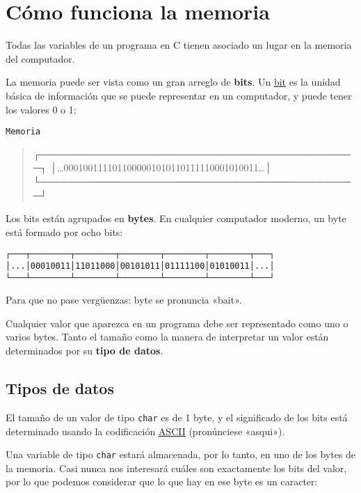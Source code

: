 \section{Cómo funciona la memoria}

Todas las variables de un programa en C tienen asociado un lugar en la
memoria del computador.

La memoria puede ser vista como un gran arreglo de \textbf{bits}. Un
\href{http://en.wikipedia.org/wiki/Bit}{bit} es la unidad básica de
información que se puede representar en un computador, y puede tener los
valores 0 o 1:

\begin{lstlisting}
Memoria
\end{lstlisting}

\begin{quote}
┌──────────────────────────────────────────────┐
│\ldots{}0001001111011000001010110111110001010011\ldots{}│
└──────────────────────────────────────────────┘
\end{quote}

Los bits están agrupados en \textbf{bytes}. En cualquier computador
moderno, un byte está formado por ocho bits:

\begin{lstlisting}
┌───┬────────┬────────┬────────┬────────┬────────┬───┐
│...│00010011│11011000│00101011│01111100│01010011│...│
└───┴────────┴────────┴────────┴────────┴────────┴───┘
\end{lstlisting}

Para que no pase vergüenzas: byte se pronuncia «bait».

Cualquier valor que aparezca en un programa debe ser representado como
uno o varios bytes. Tanto el tamaño como la manera de interpretar un
valor están determinados por su \textbf{tipo de datos}.

\subsection{Tipos de datos}

El tamaño de un valor de tipo \lstinline!char! es de 1 byte, y el
significado de los bits está determinado usando la codificación
\href{http://en.wikipedia.org/wiki/ASCII}{ASCII} (pronúnciese «asqui»).

Una variable de tipo \lstinline!char! estará almacenada, por lo tanto,
en uno de los bytes de la memoria. Casi nunca nos interesará cuáles son
exactamente los bits del valor, por lo que podemos considerar que lo que
hay en ese byte es un caracter:

